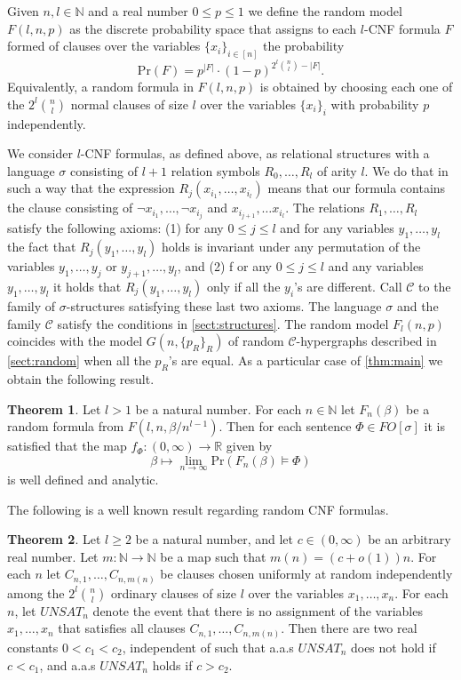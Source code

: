 \documentclass[12pt,notitlepage,a4paper]{article}
\theoremstyle{definition}
\newtheorem{theorem}{Theorem}[section]
\newcommand{\R}{\mathbb{R}}
\newcommand{\N}{\mathbb{N}}
\newcommand{\Ln}{\lim\limits_{n\to \infty}}
\newcommand{\PR}[1]{\mathrm{Pr}\left(#1\right)}
\begin{document}
Given $n, l \in \N$ and a real number $0\leq p \leq 1$ we define
the random model $F(l,n,p)$ as the discrete probability space that
assigns to each $l$-CNF formula $F$ formed of clauses over
the variables $\{x_i\}_{i\in [n]}$
 the probability
\[
\PR{F}= p^{|F|}\cdot (1-p)^{2^l\binom{n}{l}-|F|}.
\] 
Equivalently, a random formula in $F(l,n,p)$ is obtained
by choosing each one of the $2^l\binom{n}{l}$ normal 
clauses of size $l$ over the variables $\{x_i\}_{i}$
with probability $p$ independently. \par	
We consider $l$-CNF formulas, as defined above, as relational 
structures with a language $\sigma$ consisting of $l+1$ relation symbols
$R_0,\dots, R_l$ of arity $l$. We do that in such a way that the expression
$R_j(x_{i_1},\dots,x_{i_l})$ means that our formula contains the clause
consisting of $\neg x_{i_1}, \dots, \neg x_{i_j}$ and $x_{i_{j+1}},\dots
x_{i_l}$. The relations $R_1,\dots, R_l$ satisfy the 
following axioms: (1) for any $0\leq j \leq l$ and 
for any variables $y_1,\dots, y_l$ the fact that
$R_j(y_1,\dots, y_l)$ holds
is invariant under any permutation of the variables 
$y_1,\dots,y_j$ or $y_{j+1},\dots,y_l$, and (2) f
or any $0\leq j \leq l$ and 
any variables $y_1,\dots, y_l$ it holds that
$R_j(y_1,\dots, y_l)$ only if all the $y_i$'s are different. 
Call $\mathcal{C}$ to the family of $\sigma$-structures satisfying these last two axioms.
The language $\sigma$ and the family $\mathcal{C}$ satisfy the conditions in 
\cref{sect:structures}. The random model $F_l(n,p)$ coincides with the model
$G(n,\{p_R\}_{R})$ of random $\mathcal{C}$-hypergraphs described in 
\cref{sect:random} when all the $p_R$'s are equal. As a particular
case of \cref{thm:main} we obtain the following result. 
\begin{theorem} \label{thm:mainsat}
	Let $l>1$ be a natural number.
	For each $n\in \N$ let $F_n(\beta)$ be a random formula from
	$F(l,n,\beta/n^{l-1})$. Then for each sentence $\Phi\in FO[\sigma]$ 
	it is satisfied
	that the map $f_\Phi: (0,\infty) \rightarrow \R$ given by
	\[
	\beta \mapsto \Ln \PR{ F_n(\beta)\models \Phi}
	\]
	is well defined and analytic. 
\end{theorem}
The following is a well known result regarding random CNF formulas. 
\begin{theorem} 
Let $l\geq 2$ be a natural number, and let $c\in (0,\infty)$ 
be an arbitrary real number. 
Let $m:\N\rightarrow \N$ be a map such that
$m(n)=(c+o(1))n$. For each $n$ let $C_{n,1},\dots, C_{n,m(n)}$
be clauses chosen uniformly at random independently among the 
$2^l \binom{n}{l}$ ordinary clauses of size $l$ over the
variables $x_1,\dots, x_n$. For each $n$, let $UNSAT_n$
denote the event that there is no assignment of the variables
$x_1,\dots,x_n$ that satisfies all clauses $C_{n,1},\dots, C_{n,m(n)}$. 
Then there are two real constants $0<c_1<c_2$, independent of such that 
a.a.s $UNSAT_n$ does not hold if $c< c_1$, and a.a.s $UNSAT_n$ holds
if $c> c_2$. 
\end{theorem}
\end{document}
